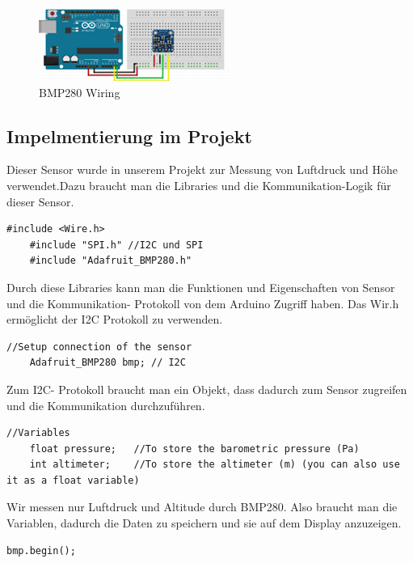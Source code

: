 \documentclass[conference]{IEEEtran}
\begin{document}
\begin{figure}
	\centering
	\includegraphics[width=0.7\linewidth]{fig36}
	\caption{BMP280 Wiring }
	\label{fig:fig36}
\end{figure}

\subsection{Impelmentierung im Projekt }

Dieser Sensor wurde in unserem Projekt zur Messung von Luftdruck und Höhe verwendet.Dazu braucht man die Libraries und die Kommunikation-Logik für dieser Sensor. 

\begin{lstlisting}[style=CStyle]
	#include <Wire.h>
	#include "SPI.h" //I2C und SPI
	#include "Adafruit_BMP280.h"
\end{lstlisting}

Durch diese Libraries kann man die Funktionen und Eigenschaften von Sensor und die Kommunikation- Protokoll von dem Arduino Zugriff haben. Das Wir.h ermöglicht der I2C Protokoll zu verwenden.  

\begin{lstlisting}[style=CStyle]
	//Setup connection of the sensor
	Adafruit_BMP280 bmp; // I2C
\end{lstlisting}

Zum I2C- Protokoll braucht man ein Objekt, dass dadurch zum Sensor zugreifen und die Kommunikation durchzuführen. 

\begin{lstlisting}[style=CStyle]
	//Variables
	float pressure;   //To store the barometric pressure (Pa)
	int altimeter;    //To store the altimeter (m) (you can also use it as a float variable)
\end{lstlisting}

Wir messen nur Luftdruck und Altitude durch BMP280. Also braucht man die Variablen, dadurch die Daten zu speichern und sie auf dem Display anzuzeigen. 

\begin{lstlisting}[style=CStyle]
	bmp.begin();
\end{lstlisting}
\end{document}
